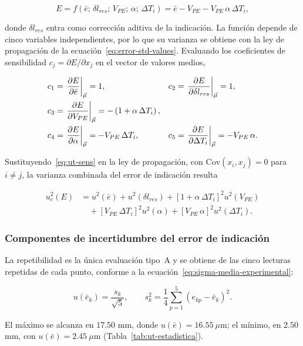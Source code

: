 \begin{equation}
  E = f(\bar e;\, \delta l_{res};\, V_{PE};\, \alpha;\, \Delta T_i)
  = \bar e - V_{PE} - V_{PE}\,\alpha\,\Delta T_i ,
  \label{eq:ut-e-model}
\end{equation}

donde $\delta l_{res}$ entra como corrección aditiva de la indicación. La función
depende de cinco variables independientes, por lo que su varianza se obtiene con la
ley de propagación de la ecuación~\eqref{eq:error-std-values}. Evaluando los
coeficientes de sensibilidad $c_j = \partial E / \partial x_j$ en el vector de
valores medios,

\begin{align}
  c_1 &= \left.\frac{\partial E}{\partial \bar e}\right|_{\vec\mu} = 1, &
  c_2 &= \left.\frac{\partial E}{\partial \delta l_{res}}\right|_{\vec\mu} = 1, \nonumber \\
  c_3 &= \left.\frac{\partial E}{\partial V_{PE}}\right|_{\vec\mu} = -\left(1 + \alpha\,\Delta T_i\right), \label{eq:ut-sens} \\
  c_4 &= \left.\frac{\partial E}{\partial \alpha}\right|_{\vec\mu} = -V_{PE}\,\Delta T_i, &
  c_5 &= \left.\frac{\partial E}{\partial \Delta T_i}\right|_{\vec\mu} = -V_{PE}\,\alpha . \nonumber
\end{align}

Sustituyendo~\eqref{eq:ut-sens} en la ley de propagación, con
$\text{Cov}(x_i, x_j) = 0$ para $i \neq j$, la varianza combinada del error de
indicación resulta

\begin{align}
  u_c^2(E) &=
  u^2(\bar e) + u^2(\delta l_{res})
  + \left[1 + \alpha\,\Delta T_i\right]^2 u^2(V_{PE}) \nonumber \\
  &\quad + \left[V_{PE}\,\Delta T_i\right]^2 u^2(\alpha)
  + \left[V_{PE}\,\alpha\right]^2 u^2(\Delta T_i).
  \label{eq:ut-sigma}
\end{align}

\subsubsection{Componentes de incertidumbre del error de indicación}

La repetibilidad es la única evaluación tipo~A y se obtiene de las cinco lecturas
repetidas de cada punto, conforme a la
ecuación~\eqref{eq:sigma-media-experimental}:

\begin{equation}
  u(\bar e_k) = \frac{s_k}{\sqrt{5}},
  \qquad
  s_k^2 = \frac{1}{4} \sum_{p=1}^{5} \left(e_{kp} - \bar e_k\right)^2 .
  \label{eq:ut-sigma-LL}
\end{equation}

El máximo se alcanza en $17.50$ mm, donde
$u(\bar e) = 16.55\ \mu\text{m}$; el mínimo, en $2.50$ mm, con
$u(\bar e) = 2.45\ \mu\text{m}$ (Tabla~\ref{tab:ut-estadistica}).

